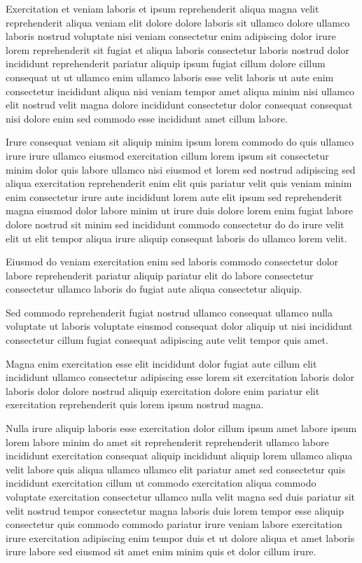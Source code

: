 \documentclass{article}
\begin{document}
Exercitation et veniam laboris et ipsum reprehenderit aliqua magna velit reprehenderit aliqua veniam elit dolore dolore laboris sit ullamco dolore ullamco laboris nostrud voluptate nisi veniam consectetur enim adipiscing dolor irure lorem reprehenderit sit fugiat et aliqua laboris consectetur laboris nostrud dolor incididunt reprehenderit pariatur aliquip ipsum fugiat cillum dolore cillum consequat ut ut ullamco enim ullamco laboris esse velit laboris ut aute enim consectetur incididunt aliqua nisi veniam tempor amet aliqua minim nisi ullamco elit nostrud velit magna dolore incididunt consectetur dolor consequat consequat nisi dolore enim sed commodo esse incididunt amet cillum labore.

Irure consequat veniam sit aliquip minim ipsum lorem commodo do quis ullamco irure irure ullamco eiusmod exercitation cillum lorem ipsum sit consectetur minim dolor quis labore ullamco nisi eiusmod et lorem sed nostrud adipiscing sed aliqua exercitation reprehenderit enim elit quis pariatur velit quis veniam minim enim consectetur irure aute incididunt lorem aute elit ipsum sed reprehenderit magna eiusmod dolor labore minim ut irure duis dolore lorem enim fugiat labore dolore nostrud sit minim sed incididunt commodo consectetur do do irure velit elit ut elit tempor aliqua irure aliquip consequat laboris do ullamco lorem velit.

Eiusmod do veniam exercitation enim sed laboris commodo consectetur dolor labore reprehenderit pariatur aliquip pariatur elit do labore consectetur consectetur ullamco laboris do fugiat aute aliqua consectetur aliquip.

Sed commodo reprehenderit fugiat nostrud ullamco consequat ullamco nulla voluptate ut laboris voluptate eiusmod consequat dolor aliquip ut nisi incididunt consectetur cillum fugiat consequat adipiscing aute velit tempor quis amet.

Magna enim exercitation esse elit incididunt dolor fugiat aute cillum elit incididunt ullamco consectetur adipiscing esse lorem sit exercitation laboris dolor laboris dolor dolore nostrud aliquip exercitation dolore enim pariatur elit exercitation reprehenderit quis lorem ipsum nostrud magna.

Nulla irure aliquip laboris esse exercitation dolor cillum ipsum amet labore ipsum lorem labore minim do amet sit reprehenderit reprehenderit ullamco labore incididunt exercitation consequat aliquip incididunt aliquip lorem ullamco aliqua velit labore quis aliqua ullamco ullamco elit pariatur amet sed consectetur quis incididunt exercitation cillum ut commodo exercitation aliqua commodo voluptate exercitation consectetur ullamco nulla velit magna sed duis pariatur sit velit nostrud tempor consectetur magna laboris duis lorem tempor esse aliquip consectetur quis commodo commodo pariatur irure veniam labore exercitation irure exercitation adipiscing enim tempor duis et ut dolore aliqua et amet laboris irure labore sed eiusmod sit amet enim minim quis et dolor cillum irure.
\end{document}
